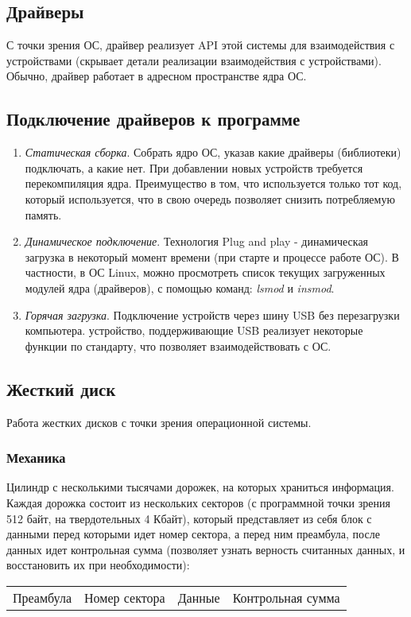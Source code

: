 \documentclass[]{article}
\begin{document}
			\subsection{Драйверы}
			 С точки зрения ОС, драйвер реализует API этой системы для взаимодействия с устройствами (скрывает детали реализации взаимодействия с устройствами). Обычно, драйвер работает в адресном пространстве ядра ОС.
			 
			 \subsection{Подключение драйверов к программе}
			 \begin{enumerate}
			 	\item \textit{Статическая сборка}. Собрать ядро ОС, указав какие драйверы (библиотеки) подключать, а какие нет. При добавлении новых устройств требуется перекомпиляция ядра. Преимущество в том, что используется только тот код, который используется, что в свою очередь позволяет снизить потребляемую память.
			 	\item \textit{Динамическое подключение}. Технология Plug and play - динамическая загрузка в некоторый момент времени (при старте и процессе работе ОС). В частности, в ОС Linux, можно просмотреть список текущих загруженных модулей ядра (драйверов), с помощью команд: \textit{lsmod} и \textit{insmod}.
			 	\item \textit{Горячая загрузка}. Подключение устройств через шину USB без перезагрузки компьютера. устройство, поддерживающие USB реализует некоторые функции по стандарту, что позволяет взаимодействовать с ОС.
			 \end{enumerate}
			 
			 \subsection{Жесткий диск}
			 Работа жестких дисков с точки зрения операционной системы.
			 
			 \subsubsection{Механика}
			 Цилиндр с несколькими тысячами дорожек, на которых храниться информация. Каждая дорожка состоит из нескольких секторов (с программной точки зрения 512 байт, на твердотельных 4 Кбайт), который представляет из себя блок с данными перед которыми идет номер сектора, а перед ним преамбула, после данных идет контрольная сумма (позволяет узнать верность считанных данных, и восстановить их при необходимости):\\
			 \begin{tabular}{|c|c|c|c|}
			 	Преамбула & Номер сектора & Данные & Контрольная сумма
			 \end{tabular}
			 
\end{document}
